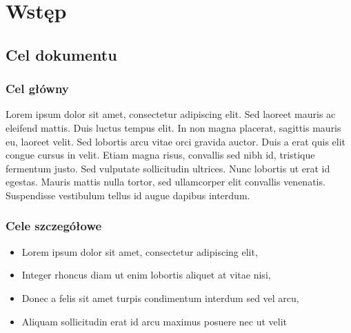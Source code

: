 \documentclass[12pt,a4paper]{book}
\begin{document}


\tableofcontents

\chapter{Wstęp}

\section{Cel dokumentu}
\subsection{Cel główny}
Lorem ipsum dolor sit amet, consectetur adipiscing elit. Sed laoreet mauris ac eleifend mattis. Duis luctus tempus elit. In non magna placerat, sagittis mauris eu, laoreet velit. Sed lobortis arcu vitae orci gravida auctor. Duis a erat quis elit congue cursus in velit. Etiam magna risus, convallis sed nibh id, tristique fermentum justo. Sed vulputate sollicitudin ultrices. Nunc lobortis ut erat id egestas. Mauris mattis nulla tortor, sed ullamcorper elit convallis venenatis. Suspendisse vestibulum tellus id augue dapibus interdum.

\subsection{Cele szczegółowe}
\begin{itemize}
    \item Lorem ipsum dolor sit amet, consectetur adipiscing elit,
    \item Integer rhoncus diam ut enim lobortis aliquet at vitae nisi,
    \item Donec a felis sit amet turpis condimentum interdum sed vel arcu,
    \item Aliquam sollicitudin erat id arcu maximus posuere nec ut velit
\end{itemize}
\end{document}
